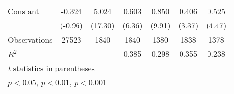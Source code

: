 \begin{table}[htbp]
\begin{tabular}{l*{6}{c}}
\addlinespace
Constant            &      -0.324         &       5.024\sym{***}&       0.603\sym{***}&       0.850\sym{***}&       0.406\sym{***}&       0.525\sym{***}\\
                    &     (-0.96)         &     (17.30)         &      (6.36)         &      (9.91)         &      (3.37)         &      (4.47)         \\
\midrule
Observations        &       27523         &        1840         &        1840         &        1380         &        1838         &        1378         \\
\(R^{2}\)           &                     &                     &       0.385         &       0.298         &       0.355         &       0.238         \\
\bottomrule
\multicolumn{7}{l}{\footnotesize \textit{t} statistics in parentheses}\\
\multicolumn{7}{l}{\footnotesize \sym{*} \(p<0.05\), \sym{**} \(p<0.01\), \sym{***} \(p<0.001\)}\\
\end{tabular}
\end{table}
